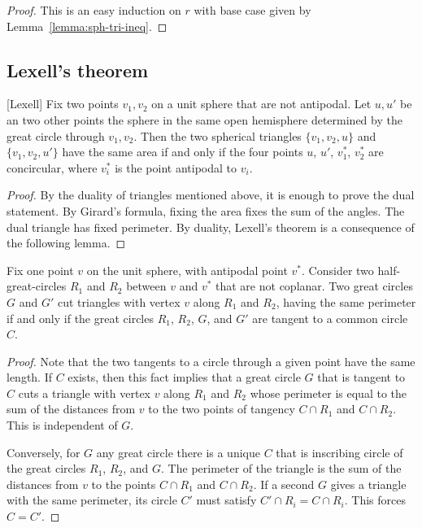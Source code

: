 \begin{proof} This is an easy induction on $r$ with base
case given by Lemma~\ref{lemma:sph-tri-ineq}.
\end{proof}

\subsection{Lexell's theorem}

\begin{lemma}[Lexell]
Fix two points $v_1,v_2$ on a unit sphere  that
are not antipodal.
Let $u,u'$ be an two other points the sphere in the same open hemisphere determined by the great circle through $v_1,v_2$.  Then the two spherical triangles $\{v_1,v_2,u\}$ and $\{v_1,v_2,u'\}$ have the same area if and only if
the four points $u$, $u'$, $v^*_1$, $v^*_2$ are concircular, where $v^*_i$ is the point antipodal to $v_i$.
\end{lemma}



\begin{proof}  By the duality of triangles mentioned above, it is enough to prove the dual statement.  By Girard's formula, fixing the area fixes the sum of the angles.  The dual triangle has fixed perimeter.  By duality, Lexell's theorem is a consequence of the following lemma.
\end{proof}

\begin{lemma}  Fix one point $v$ on the unit sphere, with antipodal point $v^*$.  Consider two half-great-circles $R_1$ and $R_2$ between $v$ and $v^*$ that are not coplanar.  Two great circles $G$ and $G'$ cut triangles with vertex $v$ along $R_1$ and $R_2$, having the same perimeter if and only if the great circles $R_1$, $R_2$, $G$, and $G'$ are tangent to a common circle $C$.
\end{lemma}

\begin{proof} Note that the two tangents to a circle through a given point have the same length.  If $C$ exists, then this fact implies that a great circle $G$ that is tangent to $C$ cuts a triangle with vertex $v$ along $R_1$ and $R_2$ whose perimeter is equal to the sum of the distances from $v$ to the two points of tangency $C\cap R_1$ and $C\cap R_2$.  This is independent of $G$.

Conversely, for $G$ any great circle there is a unique $C$ that is inscribing circle of the great circles $R_1$, $R_2$, and $G$.  The perimeter of the triangle is the sum of the distances from $v$ to the points $C\cap R_1$ and $C\cap R_2$.
If a second $G$ gives a triangle with the same perimeter, its circle $C'$
must satisfy $C'\cap R_i = C\cap R_i$.  This forces $C=C'$.
\end{proof}

